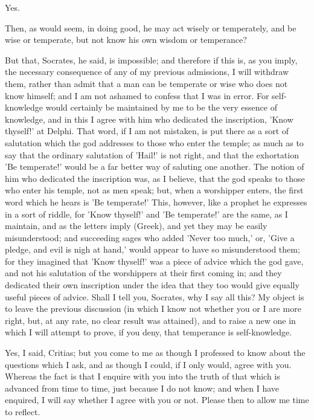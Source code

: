 \documentclass[11pt,letter]{article}
\begin{document}
\par  Yes.

\par  Then, as would seem, in doing good, he may act wisely or temperately, and be wise or temperate, but not know his own wisdom or temperance?

\par  But that, Socrates, he said, is impossible; and therefore if this is, as you imply, the necessary consequence of any of my previous admissions, I will withdraw them, rather than admit that a man can be temperate or wise who does not know himself; and I am not ashamed to confess that I was in error. For self-knowledge would certainly be maintained by me to be the very essence of knowledge, and in this I agree with him who dedicated the inscription, 'Know thyself!' at Delphi. That word, if I am not mistaken, is put there as a sort of salutation which the god addresses to those who enter the temple; as much as to say that the ordinary salutation of 'Hail!' is not right, and that the exhortation 'Be temperate!' would be a far better way of saluting one another. The notion of him who dedicated the inscription was, as I believe, that the god speaks to those who enter his temple, not as men speak; but, when a worshipper enters, the first word which he hears is 'Be temperate!' This, however, like a prophet he expresses in a sort of riddle, for 'Know thyself!' and 'Be temperate!' are the same, as I maintain, and as the letters imply (Greek), and yet they may be easily misunderstood; and succeeding sages who added 'Never too much,' or, 'Give a pledge, and evil is nigh at hand,' would appear to have so misunderstood them; for they imagined that 'Know thyself!' was a piece of advice which the god gave, and not his salutation of the worshippers at their first coming in; and they dedicated their own inscription under the idea that they too would give equally useful pieces of advice. Shall I tell you, Socrates, why I say all this? My object is to leave the previous discussion (in which I know not whether you or I are more right, but, at any rate, no clear result was attained), and to raise a new one in which I will attempt to prove, if you deny, that temperance is self-knowledge.

\par  Yes, I said, Critias; but you come to me as though I professed to know about the questions which I ask, and as though I could, if I only would, agree with you. Whereas the fact is that I enquire with you into the truth of that which is advanced from time to time, just because I do not know; and when I have enquired, I will say whether I agree with you or not. Please then to allow me time to reflect.
\end{document}
